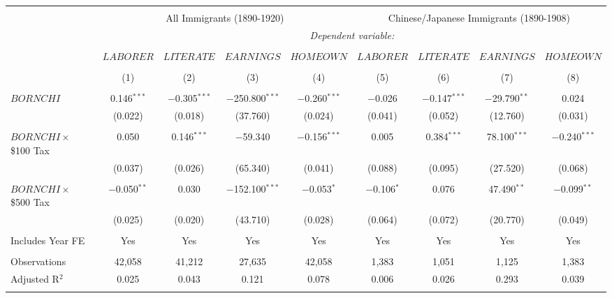 
\begin{tabular}{@{\extracolsep{5pt}}lcccccccc} 
\\[-1.8ex]\hline 
\hline \\[-1.8ex] 
 & \multicolumn{4}{c}{All Immigrants (1890-1920)} & \multicolumn{4}{c}{Chinese/Japanese Immigrants (1890-1908)} \\ 
 & \multicolumn{8}{c}{\textit{Dependent variable:}} \\ 
\cline{2-9} 
\\[-1.8ex] & $LABORER$ & $LITERATE$ & $EARNINGS$ & $HOMEOWN$ & $LABORER$ & $LITERATE$ & $EARNINGS$ & $HOMEOWN$ \\ 
\\[-1.8ex] & (1) & (2) & (3) & (4) & (5) & (6) & (7) & (8)\\ 
\hline \\[-1.8ex] 
 $BORNCHI$ & 0.146$^{***}$ & $-$0.305$^{***}$ & $-$250.800$^{***}$ & $-$0.260$^{***}$ & $-$0.026 & $-$0.147$^{***}$ & $-$29.790$^{**}$ & 0.024 \\ 
  & (0.022) & (0.018) & (37.760) & (0.024) & (0.041) & (0.052) & (12.760) & (0.031) \\ 
  & & & & & & & & \\ 
 $BORNCHI \times$ \$100 Tax & 0.050 & 0.146$^{***}$ & $-$59.340 & $-$0.156$^{***}$ & 0.005 & 0.384$^{***}$ & 78.100$^{***}$ & $-$0.240$^{***}$ \\ 
  & (0.037) & (0.026) & (65.340) & (0.041) & (0.088) & (0.095) & (27.520) & (0.068) \\ 
  & & & & & & & & \\ 
 $BORNCHI \times$ \$500 Tax & $-$0.050$^{**}$ & 0.030 & $-$152.100$^{***}$ & $-$0.053$^{*}$ & $-$0.106$^{*}$ & 0.076 & 47.490$^{**}$ & $-$0.099$^{**}$ \\ 
  & (0.025) & (0.020) & (43.710) & (0.028) & (0.064) & (0.072) & (20.770) & (0.049) \\ 
  & & & & & & & & \\ 
Includes Year FE & Yes & Yes & Yes & Yes & Yes & Yes & Yes & Yes \\ 
\hline \\[-1.8ex] 
Observations & 42,058 & 41,212 & 27,635 & 42,058 & 1,383 & 1,051 & 1,125 & 1,383 \\ 
Adjusted R$^{2}$ & 0.025 & 0.043 & 0.121 & 0.078 & 0.006 & 0.026 & 0.293 & 0.039 \\ 
\hline \\[-1.8ex] 
\end{tabular} 

